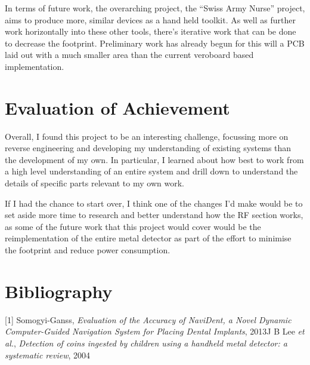 \documentclass[a4paper]{article}
\begin{document}
    In terms of future work, the overarching project, the ``Swiss Army Nurse'' project, aims to produce more, similar devices as a hand held toolkit.
    As well as further work horizontally into these other tools, there's iterative work that can be done to decrease the footprint.
    Preliminary work has already begun for this will a PCB laid out with a much smaller area than the current veroboard based implementation.

    \section{Evaluation of Achievement}
    Overall, I found this project to be an interesting challenge, focussing more on reverse engineering and developing my understanding of existing systems than the development of my own.
    In particular, I learned about how best to work from a high level understanding of an entire system and drill down to understand the details of specific parts relevant to my own work.

    If I had the chance to start over, I think one of the changes I'd make would be to set aside more time to research and better understand how the RF section works, as some of the future work that this project would cover would be the reimplementation of the entire metal detector as part of the effort to minimise the footprint and reduce power consumption.

    \section{Bibliography}
    [1] Somogyi-Ganss, \emph{Evaluation of the Accuracy of NaviDent, a Novel Dynamic Computer-Guided Navigation System for Placing Dental Implants}, 2013\newline
    [2] J B Lee \emph{et al.}, \emph{Detection of coins ingested by children using a handheld metal detector: a systematic review}, 2004
\end{document}
